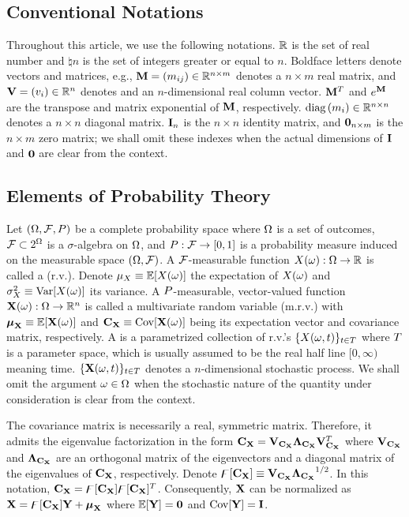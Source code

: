 \subsection{Conventional Notations}
Throughout this article, we use the following notations. $\mathbb{R}$ is the set of real number and $\natural{n}$ is the set of integers greater or equal to $n$. Boldface letters denote vectors and matrices, e.g., $\m{M} = \mtx{m_{ij}} \in \real^{n \times m}$ denotes a $n \times m$ real matrix, and $\mathbf{V} = (v_i) \in \mathbb{R}^n$ denotes and an $n$-dimensional real column vector. $\m{M}^T$ and $e^\m{M}$ are the transpose and matrix exponential of $\m{M}$, respectively. $\text{diag}\left(m_i\right) \in \mathbb{R}^{n \times n}$ denotes a $n \times n$ diagonal matrix. $\mI_n$ is the $n \times n$ identity matrix, and $\mZ_{n \times m}$ is the $n \times m$ zero matrix; we shall omit these indexes when the actual dimensions of $\mI$ and $\mZ$ are clear from the context.

\subsection{Elements of Probability Theory}
Let $(\Omega, \mathcal{F}, P)$ be a complete probability space \cite{durrett2010} where $\Omega$ is a set of outcomes, $\mathcal{F} \subset 2^\Omega$ is a $\sigma$-algebra on $\Omega$, and $P: \mathcal{F} \to [0, 1]$ is a probability measure induced on the measurable space $(\Omega, \mathcal{F})$. A $\mathcal{F}$-measurable function $\rv{X}(\o): \outcomes \to \real$ is called a  (r.v.). Denote $\exp_\rv{X} \eqden \oExp{\rv{X}(\o)}$ the expectation of $\rv{X}(\o)$ and $\var_\rv{X} \eqden \oVar{\rv{X}(\o)}$ its variance. A $P$-measurable, vector-valued function $\mrv{X}(\o): \outcomes \to \real^n$ is called a multivariate random variable (m.r.v.) with $\vExp_\mrv{X} \eqden \oExp{\mrv{X}(\o)}$ and $\mCov_\mrv{X} \eqden \oCov{\mrv{X}(\o)}$ being its expectation vector and covariance matrix, respectively. A  is a parametrized collection of r.v.'s $\{ \rv{X}(\o, \t) \}_{\t \in \sTime}$ where $T$ is a parameter space, which is usually assumed to be the real half line $[0, \infty)$ meaning time. $\{ \mrv{X}(\o, \t) \}_{\t \in \sTime}$ denotes a $n$-dimensional stochastic process. We shall omit the argument $\omega \in \Omega$ when the stochastic nature of the quantity under consideration is clear from the context.

The covariance matrix is necessarily a real, symmetric matrix. Therefore, it admits the eigenvalue factorization \cite{press2007} in the form $\mCov_\mrv{X} = \m{V}_{\mCov_\mrv{X}} \m{\Lambda}_{\mCov_\mrv{X}} \m{V}_{\mCov_\mrv{X}}^T$ where $\m{V}_{\mCov_\mrv{X}}$ and $\m{\Lambda}_{\mCov_\mrv{X}}$ are an orthogonal matrix of the eigenvectors and a diagonal matrix of the eigenvalues of $\mCov_\mrv{X}$, respectively. Denote $\oEigen{\mCov_\mrv{X}} \eqden \m{V}_{\mCov_\mrv{X}} {\m{\Lambda}_{\mCov_\mrv{X}}}^\ifrac{1}{2}$. In this notation, $\mCov_\mrv{X} = \oEigen{\mCov_\mrv{X}} \oEigen{\mCov_\mrv{X}}^T$. Consequently, $\mrv{X}$ can be normalized as $\mrv{X} = \oEigen{\mCov_\mrv{X}} \mrv{y} + \vExp_\mrv{X}$ where $\oExp{\mrv{y}} = \mZ$ and $\oCov{\mrv{y}} = \mI$.

